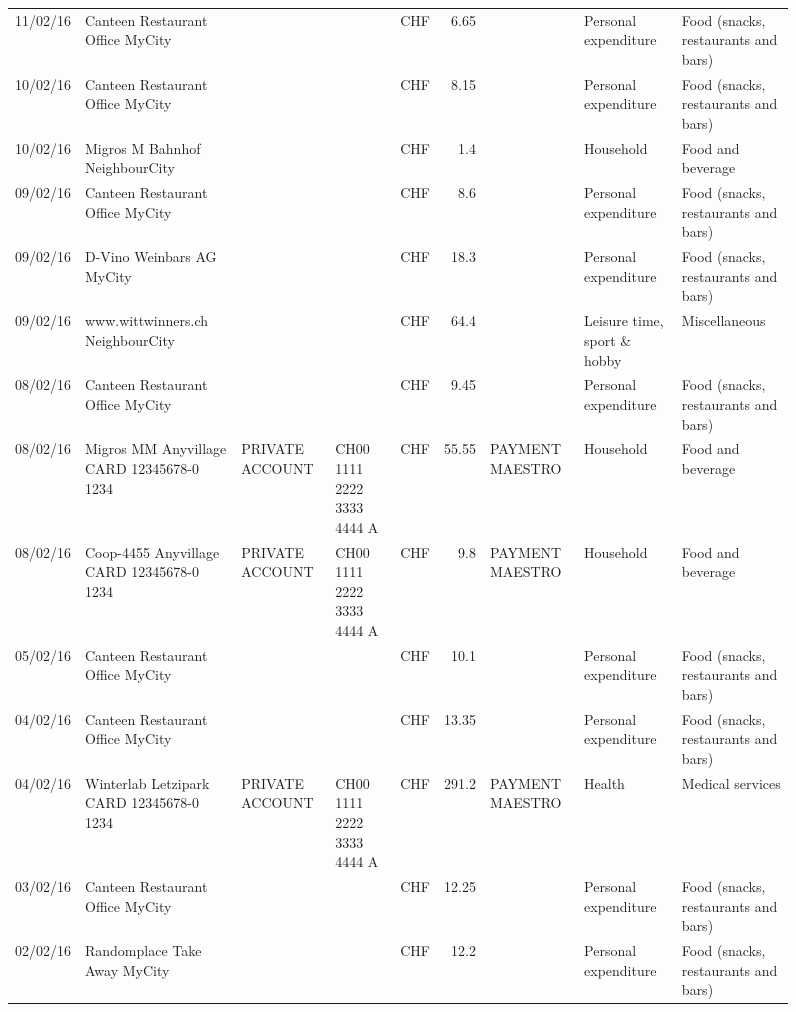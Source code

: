 \begin{landscape}
\begin{sidewaysfigure}
\begin{table}[h]
\begin{center}
\begin{tabular}{rllllrlll}
		11/02/16 & Canteen Restaurant Office      MyCity &       &       & CHF   & 6.65  &       & Personal expenditure & Food (snacks, restaurants and bars) \\
		10/02/16 & Canteen Restaurant Office      MyCity &       &       & CHF   & 8.15  &       & Personal expenditure & Food (snacks, restaurants and bars) \\
		10/02/16 & Migros M Bahnhof         NeighbourCity &       &       & CHF   & 1.4   &       & Household & Food and beverage \\
		09/02/16 & Canteen Restaurant Office      MyCity &       &       & CHF   & 8.6   &       & Personal expenditure & Food (snacks, restaurants and bars) \\
		09/02/16 & D-Vino Weinbars AG       MyCity &       &       & CHF   & 18.3  &       & Personal expenditure & Food (snacks, restaurants and bars) \\
		09/02/16 & www.wittwinners.ch        NeighbourCity &       &       & CHF   & 64.4  &       & Leisure time, sport \& hobby & Miscellaneous \\
		08/02/16 & Canteen Restaurant Office      MyCity &       &       & CHF   & 9.45  &       & Personal expenditure & Food (snacks, restaurants and bars) \\
		08/02/16 & Migros MM Anyvillage CARD 12345678-0 1234 & PRIVATE ACCOUNT & CH00 1111 2222 3333 4444 A & CHF   & 55.55 & PAYMENT MAESTRO & Household & Food and beverage \\
		08/02/16 & Coop-4455 Anyvillage CARD 12345678-0 1234 & PRIVATE ACCOUNT & CH00 1111 2222 3333 4444 A & CHF   & 9.8   & PAYMENT MAESTRO & Household & Food and beverage \\
		05/02/16 & Canteen Restaurant Office      MyCity &       &       & CHF   & 10.1  &       & Personal expenditure & Food (snacks, restaurants and bars) \\
		04/02/16 & Canteen Restaurant Office      MyCity &       &       & CHF   & 13.35 &       & Personal expenditure & Food (snacks, restaurants and bars) \\
		04/02/16 & Winterlab Letzipark CARD 12345678-0 1234 & PRIVATE ACCOUNT & CH00 1111 2222 3333 4444 A & CHF   & 291.2 & PAYMENT MAESTRO & Health & Medical services  \\
		03/02/16 & Canteen Restaurant Office      MyCity &       &       & CHF   & 12.25 &       & Personal expenditure & Food (snacks, restaurants and bars) \\
		02/02/16 & Randomplace Take Away     MyCity &       &       & CHF   & 12.2  &       & Personal expenditure & Food (snacks, restaurants and bars) \\

\end{tabular}
\end{center}
\end{table}
\end{sidewaysfigure}
\end{landscape}
